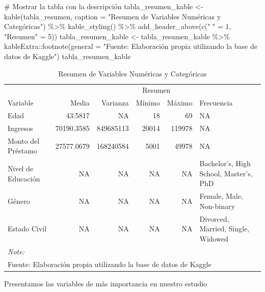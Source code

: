 \documentclass[
  letterpaper,
  DIV=11,
  numbers=noendperiod]{scrreprt}
\newenvironment{Shaded}{\begin{snugshade}}{\end{snugshade}}
\newcommand{\AttributeTok}[1]{\textcolor[rgb]{0.40,0.45,0.13}{#1}}
\newcommand{\CommentTok}[1]{\textcolor[rgb]{0.37,0.37,0.37}{#1}}
\newcommand{\DecValTok}[1]{\textcolor[rgb]{0.68,0.00,0.00}{#1}}
\newcommand{\FunctionTok}[1]{\textcolor[rgb]{0.28,0.35,0.67}{#1}}
\newcommand{\NormalTok}[1]{\textcolor[rgb]{0.00,0.23,0.31}{#1}}
\newcommand{\OtherTok}[1]{\textcolor[rgb]{0.00,0.23,0.31}{#1}}
\newcommand{\SpecialCharTok}[1]{\textcolor[rgb]{0.37,0.37,0.37}{#1}}
\newcommand{\StringTok}[1]{\textcolor[rgb]{0.13,0.47,0.30}{#1}}
\begin{document}
\begin{Shaded}
\begin{Highlighting}[]
\CommentTok{\# Mostrar la tabla con la descripción}
\NormalTok{tabla\_resumen\_kable }\OtherTok{\textless{}{-}} \FunctionTok{kable}\NormalTok{(tabla\_resumen, }\AttributeTok{caption =} \StringTok{"Resumen de Variables Numéricas y Categóricas"}\NormalTok{) }\SpecialCharTok{\%\textgreater{}\%}
  \FunctionTok{kable\_styling}\NormalTok{() }\SpecialCharTok{\%\textgreater{}\%}
  \FunctionTok{add\_header\_above}\NormalTok{(}\FunctionTok{c}\NormalTok{(}\StringTok{" "} \OtherTok{=} \DecValTok{1}\NormalTok{, }\StringTok{"Resumen"} \OtherTok{=} \DecValTok{5}\NormalTok{)) }
\NormalTok{tabla\_resumen\_kable }\OtherTok{\textless{}{-}}\NormalTok{ tabla\_resumen\_kable }\SpecialCharTok{\%\textgreater{}\%}
\NormalTok{  kableExtra}\SpecialCharTok{::}\FunctionTok{footnote}\NormalTok{(}\AttributeTok{general =} \StringTok{"Fuente: Elaboración propia utilizando la base de datos de Kaggle"}\NormalTok{)}
\NormalTok{tabla\_resumen\_kable}
\end{Highlighting}
\end{Shaded}

\begin{longtable}[t]{lrrrrl}
\caption{Resumen de Variables Numéricas y Categóricas}\\
\toprule
\multicolumn{1}{c}{ } & \multicolumn{5}{c}{Resumen} \\
\cmidrule(l{3pt}r{3pt}){2-6}
Variable & Media & Varianza & Mínimo & Máximo & Frecuencia\\
\midrule
Edad & 43.5817 & NA & 18 & 69 & NA\\
Ingresos & 70190.3585 & 849685113 & 20014 & 119978 & NA\\
Monto del Préstamo & 27577.0679 & 168240584 & 5001 & 49978 & NA\\
Nivel de Educación & NA & NA & NA & NA & Bachelor's, High School, Master's, PhD\\
Género & NA & NA & NA & NA & Female, Male, Non-binary\\
\addlinespace
Estado Civil & NA & NA & NA & NA & Divorced, Married, Single, Widowed\\
\bottomrule
\multicolumn{6}{l}{\rule{0pt}{1em}\textit{Note: }}\\
\multicolumn{6}{l}{\rule{0pt}{1em}Fuente: Elaboración propia utilizando la base de datos de Kaggle}\\
\end{longtable}

Presentamos las variables de más importancia en nuestro estudio
\end{document}
